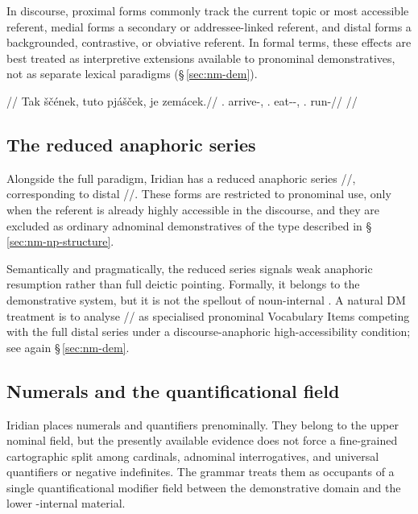 In discourse, proximal forms commonly track the current topic or most accessible referent, medial forms
a secondary or addressee-linked referent, and distal forms a backgrounded,
contrastive, or obviative referent. In formal terms, these effects are best
treated as interpretive extensions available to pronominal demonstratives, not
as separate lexical paradigms (§\,\ref{sec:nm-dem}).

\ex
\begingl
\glpreamble {}//
\gla Tak ščének, tuto pjášček, je zemácek.//
\glb \Prox{}.\Dir{} arrive-\Pf{}, \Med{}.\Dir{} eat-\Antip{}-\Pf{}, \Dist{}.\Dir{} run-\Pf{}//
\glft {}//
\endgl
\xe

\subsection{The reduced anaphoric series}
\label{sec:nm-dem-reduced}

Alongside the full paradigm, Iridian has a reduced anaphoric series
//, corresponding to distal
//. These forms are restricted to pronominal use,
only when the referent is already highly accessible in the discourse, and they
are excluded as ordinary adnominal demonstratives of the type described in
§\,\ref{sec:nm-np-structure}.

Semantically and pragmatically, the reduced series signals weak anaphoric
resumption rather than full deictic pointing. Formally, it belongs to the
demonstrative system, but it is not the spellout of noun-internal
. A natural DM treatment is to analyse //
as specialised pronominal Vocabulary Items competing with the full distal series
under a discourse-anaphoric high-accessibility condition; see again
§\,\ref{sec:nm-dem}.

\pex
\a {} 
\a {} 
\xe

\subsection{Numerals and the quantificational field}
\label{sec:nm-quant}

Iridian places numerals and quantifiers prenominally. They belong to the upper
nominal field, but the presently available evidence does not force a
fine-grained cartographic split among cardinals, adnominal interrogatives, and
universal quantifiers or negative indefinites. The grammar treats them as
occupants of a single quantificational modifier field between the demonstrative
domain and the lower -internal material.


